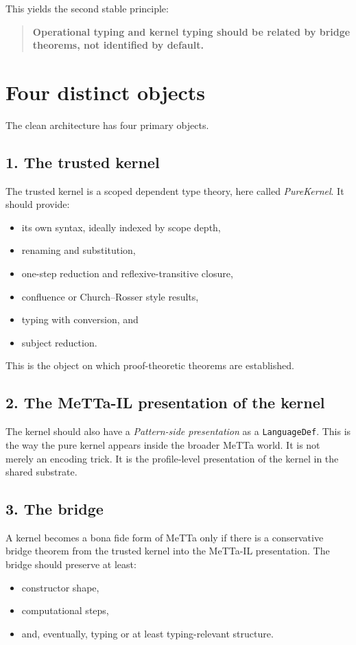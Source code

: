 \documentclass[11pt]{article}
\begin{document}
This yields the second stable principle:

\begin{quote}
\textbf{Operational typing and kernel typing should be related by bridge theorems, not identified by default.}
\end{quote}

\section{Four distinct objects}

The clean architecture has four primary objects.

\subsection{1. The trusted kernel}

The trusted kernel is a scoped dependent type theory, here called \emph{PureKernel}. It should provide:
\begin{itemize}
  \item its own syntax, ideally indexed by scope depth,
  \item renaming and substitution,
  \item one-step reduction and reflexive-transitive closure,
  \item confluence or Church--Rosser style results,
  \item typing with conversion, and
  \item subject reduction.
\end{itemize}

This is the object on which proof-theoretic theorems are established.

\subsection{2. The MeTTa-IL presentation of the kernel}

The kernel should also have a \emph{Pattern-side presentation} as a \texttt{LanguageDef}. This is the way the pure kernel appears inside the broader MeTTa world. It is not merely an encoding trick. It is the profile-level presentation of the kernel in the shared substrate.

\subsection{3. The bridge}

A kernel becomes a bona fide form of MeTTa only if there is a conservative bridge theorem from the trusted kernel into the MeTTa-IL presentation. The bridge should preserve at least:
\begin{itemize}
  \item constructor shape,
  \item computational steps,
  \item and, eventually, typing or at least typing-relevant structure.
\end{itemize}
\end{document}
